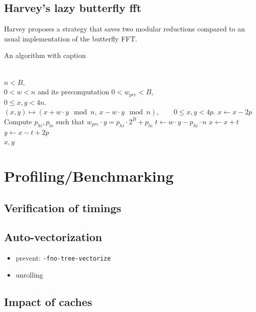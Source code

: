 \documentclass[a4paper]{article}
\begin{document}
\subsection{Harvey's lazy butterfly fft}

Harvey proposes a strategy\cite{DBLP:journals/corr/abs-1205-2926} that saves two modular reductions compared to an usual
implementation of the butterfly FFT.


\begin{algorithm}
    \caption{An algorithm with caption}\label{alg:cap}
    \begin{algorithmic}
        \Require \\
            $n < B$, \\
            $0 < w < n$ and its precomputation $0 < w_{pre} < B$, \\
            $0 \leq x, y < 4n$.
        \Ensure \\
            $(x,y) \mapsto (x + w\cdot y \mod n,\ x - w\cdot y \mod n), \qquad 0 \leq x,y < 4p.$
            \State $x \gets x - 2p$
        \EndIf
        \State Compute $p_{hi}, p_{lo}$ such that $w_{pre} \cdot y = p_{hi}\cdot 2^B + p_{lo}$
        \State $t \gets w\cdot y - p_{hi}\cdot n$
        \State $x \gets x + t$
        \State $y \gets x - t + 2p$ \\
        \Return $x,y$
    \end{algorithmic}
\end{algorithm}


\section{Profiling/Benchmarking}


\subsection{Verification of timings}

\subsection{Auto-vectorization}

\begin{itemize}
    \item prevent: \texttt{-fno-tree-vectorize}
    \item unrolling
\end{itemize}

\subsection{Impact of caches} %
\end{document}
